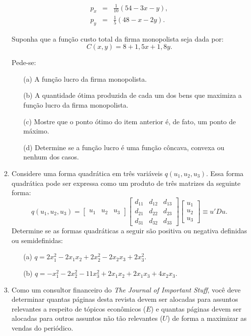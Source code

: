 \documentclass[preprintnumbers,nofootinbib,amsmath,amssymb,12pt]{article}
\begin{document}
\begin{enumerate}
    \begin{eqnarray*}
        p_x &=& \frac{1}{10}(54 - 3x - y), \\
        p_y &=& \frac{1}{5}(48-x-2y).
    \end{eqnarray*}
    
    Suponha que a função custo total da firma monopolista seja dada por:
    \[
    C(x,y) = 8 + 1,5x + 1,8y.
    \]
    
    Pede-se:
    \begin{enumerate}
        \item[(a)] A função lucro da firma monopolista.
        \item[(b)] A quantidade ótima produzida de cada um dos bens que maximiza a função lucro da firma monopolista.
        \item[(c)] Mostre que o ponto ótimo do item anterior é, de fato, um ponto de máximo.
        \item[(d)] Determine se a função lucro é uma função côncava, convexa ou nenhum dos casos.
    \end{enumerate}

    \item Considere uma forma quadrática em três variáveis $q(u_1, u_2, u_3)$. Essa forma quadrática pode ser expressa como um produto de três matrizes da seguinte forma:
\[
q(u_1,u_2,u_3) = \begin{bmatrix}
    u_1 & u_2 & u_3
\end{bmatrix} \begin{bmatrix}
    d_{11} & d_{12} & d_{13} \\
    d_{21} & d_{22} & d_{23} \\
    d_{31} & d_{32} & d_{33}
\end{bmatrix}\begin{bmatrix}
    u_1 \\ u_2 \\ u_3
\end{bmatrix} \equiv u'Du.
\]
Determine se as formas quadráticas a seguir são positiva ou negativa definidas ou semidefinidas:
\begin{itemize}
    \item[(a)] $q = 2x_1^2 - 2x_1x_2 + 2x_2^2 - 2x_2x_3 + 2x_3^2$.
    \item[(b)] $q = -x_1^2 - 2x_2^2 - 11x_3^2 + 2x_1x_2 + 2x_1x_3 + 4x_2x_3$.
\end{itemize}

\item Como um consultor financeiro do \emph{The Journal of Important Stuff}, você deve determinar quantas páginas desta revista devem ser alocadas para assuntos relevantes a respeito de tópicos econômicos ($E$) e quantas páginas devem ser alocadas para outros assuntos não tão relevantes ($U$) de forma a maximizar as vendas do periódico.


\end{enumerate}
\end{document}
